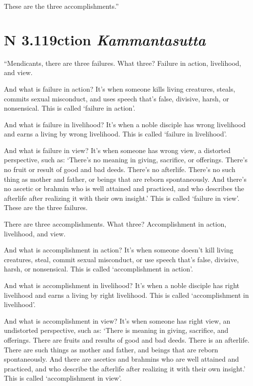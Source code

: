 \documentclass[12pt,openany]{book}%
\newcommand*{\suttatitleacronym}[1]{\smaller[2]{#1}\vspace*{.3em}}
\newcommand*{\suttatitletranslation}[1]{\linebreak{#1}}
\newcommand*{\suttatitleroot}[1]{\linebreak\smaller[2]\itshape{#1}}
\newcommand*{\tocacronym}[1]{\hspace*{-3.3em}{#1}\quad}
\newcommand*{\toctranslation}[1]{#1}
\newcommand*{\tocroot}[1]{(\textit{#1})}
\begin{document}
These are the three accomplishments.” 

%
\section*{{\suttatitleacronym AN 3.119}{\suttatitletranslation Action }{\suttatitleroot Kammantasutta}}
\addcontentsline{toc}{section}{\tocacronym{AN 3.119} \toctranslation{Action } \tocroot{Kammantasutta}}

“Mendicants, there are three failures. What three? Failure in action, livelihood, and view. 

And what is failure in action? It’s when someone kills living creatures, steals, commits sexual misconduct, and uses speech that’s false, divisive, harsh, or nonsensical. This is called ‘failure in action’. 

And what is failure in livelihood? It’s when a noble disciple has wrong livelihood and earns a living by wrong livelihood. This is called ‘failure in livelihood’. 

And what is failure in view? It’s when someone has wrong view, a distorted perspective, such as: ‘There’s no meaning in giving, sacrifice, or offerings. There’s no fruit or result of good and bad deeds. There’s no afterlife. There’s no such thing as mother and father, or beings that are reborn spontaneously. And there’s no ascetic or brahmin who is well attained and practiced, and who describes the afterlife after realizing it with their own insight.’ This is called ‘failure in view’. These are the three failures. 

There are three accomplishments. What three? Accomplishment in action, livelihood, and view. 

And what is accomplishment in action? It’s when someone doesn’t kill living creatures, steal, commit sexual misconduct, or use speech that’s false, divisive, harsh, or nonsensical. This is called ‘accomplishment in action’. 

And what is accomplishment in livelihood? It’s when a noble disciple has right livelihood and earns a living by right livelihood. This is called ‘accomplishment in livelihood’. 

And what is accomplishment in view? It’s when someone has right view, an undistorted perspective, such as: ‘There is meaning in giving, sacrifice, and offerings. There are fruits and results of good and bad deeds. There is an afterlife. There are such things as mother and father, and beings that are reborn spontaneously. And there are ascetics and brahmins who are well attained and practiced, and who describe the afterlife after realizing it with their own insight.’ This is called ‘accomplishment in view’. 
\end{document}
